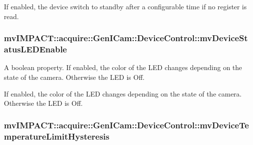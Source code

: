 If enabled, the device switch to standby after a configurable time if no register is read. \hypertarget{classmv_i_m_p_a_c_t_1_1acquire_1_1_gen_i_cam_1_1_device_control_a1210386760746822691ccf23f0fe9d4e}{
\subsubsection[{mv\+Device\+Status\+L\+E\+D\+Enable}]{ mv\+I\+M\+P\+A\+C\+T\+::acquire\+::\+Gen\+I\+Cam\+::\+Device\+Control\+::mv\+Device\+Status\+L\+E\+D\+Enable}}\label{classmv_i_m_p_a_c_t_1_1acquire_1_1_gen_i_cam_1_1_device_control_a1210386760746822691ccf23f0fe9d4e}


A boolean property. If enabled, the color of the L\+E\+D changes depending on the state of the camera. Otherwise the L\+E\+D is Off. 

If enabled, the color of the L\+E\+D changes depending on the state of the camera. Otherwise the L\+E\+D is Off. \hypertarget{classmv_i_m_p_a_c_t_1_1acquire_1_1_gen_i_cam_1_1_device_control_a8f6f3385951482b605c5cf9a096741fa}{
\subsubsection[{mv\+Device\+Temperature\+Limit\+Hysteresis}]{ mv\+I\+M\+P\+A\+C\+T\+::acquire\+::\+Gen\+I\+Cam\+::\+Device\+Control\+::mv\+Device\+Temperature\+Limit\+Hysteresis}}\label{classmv_i_m_p_a_c_t_1_1acquire_1_1_gen_i_cam_1_1_device_control_a8f6f3385951482b605c5cf9a096741fa}


